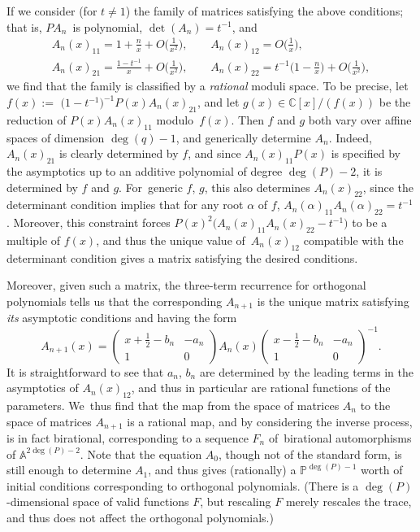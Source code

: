 \documentclass[pdftex]{sigma}
\newcommand{\C}{\mathbb{C}}
\theoremstyle{definition}
\numberwithin{equation}{section}
\begin{document}
If we consider (for $t\ne 1$) the family of matrices satisfying the above
conditions; that is, $PA_n$~is polynomial, $\det(A_n)=t^{-1}$, and
\begin{gather*}
A_n(x)_{11} = 1+\tfrac{n}{x}+O\big(\tfrac{1}{x^2}\big),\qquad
A_n(x)_{12} = O\big(\tfrac{1}{x}\big),\\
A_n(x)_{21} = \tfrac{1-t^{-1}}{x} + O\big(\tfrac{1}{x^2}\big),\qquad
A_n(x)_{22} = t^{-1}\big(1-\tfrac{n}{x}\big)+O\big(\tfrac{1}{x^2}\big),
\end{gather*}
we find that the family is classified by a {\em rational} moduli space. To
be precise, let $f(x):=$ \mbox{$\big(1-t^{-1}\big)^{-1}P(x)A_n(x)_{21}$}, and let $g(x)\in
\C[x]/(f(x))$ be the reduction of $P(x)A_n(x)_{11}$ modu\-lo~$f(x)$. Then
$f$ and $g$ both vary over affine spaces of dimension $\deg(q)-1$, and
generically determine $A_n$. Indeed, $A_n(x)_{21}$ is clearly determined
by $f$, and since $A_n(x)_{11}P(x)$ is specified by the asymptotics up to
an additive polynomial of degree $\deg(P)-2$, it is determined by $f$ and
$g$. For~generic $f$, $g$, this also determines $A_n(x)_{22}$, since the
determinant condition implies that for any root $\alpha$ of $f$,
$A_n(\alpha)_{11}A_n(\alpha)_{22}=t^{-1}$. Moreover, this constraint forces
$P(x)^2 \big(A_n(x)_{11}A_n(x)_{22}-t^{-1}\big)$ to be a multiple of $f(x)$, and
thus the unique value of~$A_n(x)_{12}$ compatible with the determinant
condition gives a matrix satisfying the desired conditions.

Moreover, given such a matrix, the three-term recurrence for orthogonal
polynomials tells us that the corresponding $A_{n+1}$ is the unique matrix
satisfying {\em its} asymptotic conditions and having the form
\[
A_{n+1}(x)=
\begin{pmatrix}
 x+\frac{1}{2}-b_n & -a_n\\
 1 & 0
\end{pmatrix}
A_n(x)
\begin{pmatrix}
 x-\frac{1}{2}-b_n & -a_n\\
 1 & 0
\end{pmatrix}^{-1}.
\]
It is straightforward to see that $a_n$, $b_n$ are determined by the
leading terms in the asymptotics of $A_n(x)_{12}$, and thus in particular
are rational functions of the parameters. We~thus find that the map from
the space of matrices $A_n$ to the space of matrices $A_{n+1}$ is a
rational map, and by considering the inverse process, is in fact
birational, corresponding to a sequence $F_n$ of~bira\-tional automorphisms
of $\mathbb A^{2\deg(P)-2}$. Note that the equation $A_0$, though not of the
standard form, is still enough to determine $A_1$, and thus gives
(rationally) a $\mathbb P^{\deg(P)-1}$ worth of initial conditions corresponding
to orthogonal polynomials. (There is a $\deg(P)$-dimensional space of
valid functions $F$, but rescaling $F$ merely rescales the trace, and thus
does not affect the orthogonal polynomials.)
\end{document}

